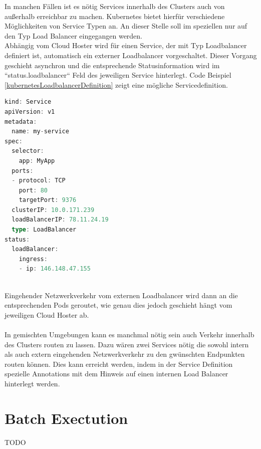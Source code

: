 In manchen Fällen ist es nötig Services innerhalb des Clusters auch von außerhalb erreichbar zu machen. Kubernetes bietet hierfür verschiedene Möglichkeiten von Service Typen an. An dieser Stelle soll im speziellen nur auf den Typ Load Balancer eingegangen werden.\\
Abhängig vom Cloud Hoster wird für einen Service, der mit Typ Loadbalancer definiert ist, automatisch ein externer Loadbalancer vorgeschaltet. Dieser Vorgang geschieht asynchron und die entsprechende Statusinformation wird im ``status.loadbalancer`` Feld des jeweiligen Service hinterlegt. Code Beispiel \ref{kubernetesLoadbalancerDefinition} zeigt eine mögliche Servicedefinition.\\
\begin{minipage}{\linewidth}
	\begin{lstlisting}[frame=single,caption=Kubernetes Service mit Loadbalancer Definition, label=kubernetesLoadbalancerDefinition, language=Scala]
kind: Service
apiVersion: v1
metadata:
  name: my-service
spec:
  selector:
    app: MyApp
  ports:
  - protocol: TCP
    port: 80
    targetPort: 9376
  clusterIP: 10.0.171.239
  loadBalancerIP: 78.11.24.19
  type: LoadBalancer
status:
  loadBalancer:
    ingress:
    - ip: 146.148.47.155
	\end{lstlisting}
\end{minipage}\\
Eingehender Netzwerkverkehr vom externen Loadbalancer wird dann an die entsprechenden Pods geroutet, wie genau dies jedoch geschieht hängt vom jeweiligen Cloud Hoster ab.\\\\
In gemischten Umgebungen kann es manchmal nötig sein auch Verkehr innerhalb des Clusters routen zu lassen. Dazu wären zwei Services nötig die sowohl intern als auch extern eingehenden Netzwerkverkehr zu den gwünschten Endpunkten routen können. Dies kann erreicht werden, indem in der Service Definition spezielle Annotations mit dem Hinweis auf einen internen Load Balancer hinterlegt werden.\\
\section{Batch Exectution}
TODO
